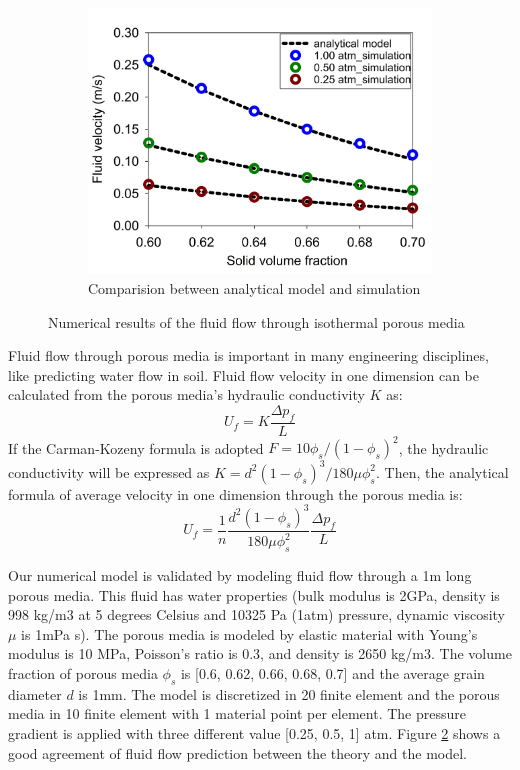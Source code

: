 \documentclass[preprint,12pt]{elsarticle}
\begin{document}
\begin{figure}[h]
\begin{subfigure}[d]{0.5\linewidth}
\includegraphics[width=\linewidth]{porousflow.jpg}
\caption{Comparision between analytical model and simulation}
\label{fig:3d}
\end{subfigure}
\caption{Numerical results of the fluid flow through isothermal porous media}
\label{fig:porousflow}
\end{figure}
%
%
Fluid flow through porous media is important in many engineering disciplines, like predicting water flow in soil. Fluid flow velocity in one dimension can be calculated from the porous media's hydraulic conductivity $K$ as:\\
%
%
\begin{equation}
  {U}_f   = K \frac{\Delta p_f}{L}
\end{equation}
%
%
If the Carman-Kozeny formula is adopted $F = 10\phi_s/(1-\phi_s)^2$, the hydraulic conductivity will be expressed as  $K = d^2 (1-\phi_s)^3 / 180 \mu \phi_s^2$. Then, the analytical formula of average velocity in one dimension through the porous media is:\\
%
%
\begin{equation}
  {U}_f  = \frac{1}{n} \frac{d^2 (1-\phi_s)^3}{180 \mu \phi_s^2} \frac{\Delta p_f}{L}
\end{equation}

%
%
Our numerical model is validated by modeling fluid flow through a 1m long porous media. This fluid has water properties (bulk modulus is 2GPa, density is 998 kg/m3 at 5 degrees Celsius and 10325 Pa (1atm) pressure, dynamic viscosity $\mu$ is 1mPa s). The porous media is modeled by elastic material with Young's modulus is 10 MPa, Poisson's ratio is 0.3, and density is 2650 kg/m3. The volume fraction of porous media $\phi_s$ is [0.6, 0.62, 0.66, 0.68, 0.7] and the average grain diameter $d$ is 1mm. The model is discretized in 20 finite element and the porous media in 10 finite element with 1 material point per element. The pressure gradient is applied with three different value [0.25, 0.5, 1] atm. Figure \ref{fig:porousflow} shows a good agreement of fluid flow prediction between the theory and the model. \\
%
\end{document}
